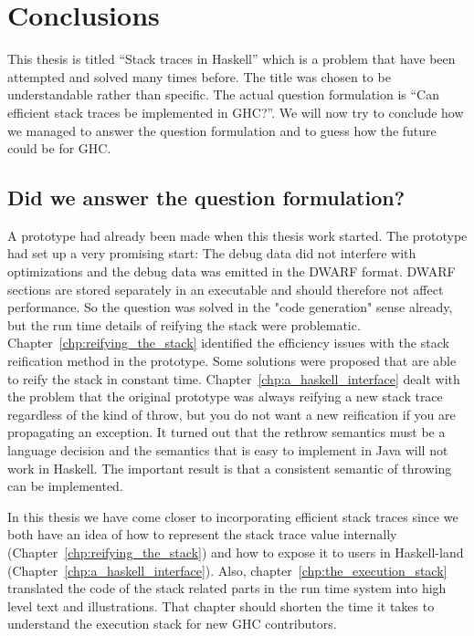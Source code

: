 \chapter{Conclusions}

This thesis is titled ``Stack traces in Haskell'' which is a problem
that have been attempted and solved many times before. The title was
chosen to be understandable rather than specific. The actual question
formulation is ``Can efficient stack traces be implemented in GHC?''.
We will now try to conclude how we managed to answer the question
formulation and to guess how the future could be for GHC.

\section{Did we answer the question formulation?}

A prototype had already been made when this thesis work started. The
prototype had set up a very promising start: The debug data did not
interfere with optimizations and the debug data was emitted in the DWARF
format. DWARF sections are stored separately in an executable and should
therefore not affect performance. So the question was solved in the
"code generation" sense already, but the run time details of reifying
the stack were problematic. Chapter~\ref{chp:reifying_the_stack}
identified the efficiency issues with the stack reification method in
the prototype. Some solutions were proposed that are able to reify the
stack in constant time. Chapter~\ref{chp:a_haskell_interface} dealt
with the problem that the original prototype was always reifying a new
stack trace regardless of the kind of throw, but you do not want a new
reification if you are propagating an exception. It turned out that the
rethrow semantics must be a language decision and the semantics that is
easy to implement in Java will not work in Haskell. The important
result is that a consistent semantic of throwing can be implemented.

In this thesis we have come closer to incorporating
efficient stack traces since we both have an idea of how
to represent the stack trace value internally (Chapter~\ref{chp:reifying_the_stack}) and how to expose it to users in
Haskell-land (Chapter~\ref{chp:a_haskell_interface}). Also, chapter~\ref{chp:the_execution_stack} translated the code of the stack related
parts in the run time system into high level text and illustrations.
That chapter should shorten the time it takes to understand the
execution stack for new GHC contributors.

